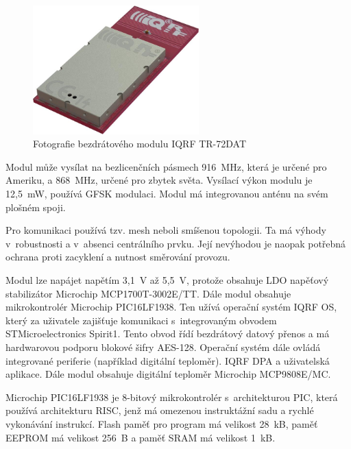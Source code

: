 \documentclass[12pt,a4paper]{article}
\begin{document}
\begin{figure}[H]
\centering
\label{fig:iqrf/fotka}
\includegraphics[width = 64mm]{img/iqrf/dctr-72dat.png}
\caption{Fotografie bezdrátového modulu IQRF TR-72DAT}
\end{figure}

Modul může vysílat na bezlicenčních pásmech 916~MHz, která je určené pro Ameriku, a 868~MHz, určené pro zbytek světa. Vysílací výkon modulu je 12,5~mW, používá GFSK modulaci. Modul má integrovanou anténu na svém plošném spoji.

Pro komunikaci používá tzv. mesh neboli smíšenou topologii. Ta má výhody v~robustnosti a v~absenci centrálního prvku. Její nevýhodou je naopak potřebná ochrana proti zacyklení a nutnost směrování provozu.

Modul lze napájet napětím 3,1~V až 5,5~V, protože obsahuje LDO napěťový stabilizátor Microchip MCP1700T-3002E/TT. Dále modul obsahuje mikrokontrolér Microchip PIC16LF1938. Ten užívá operační systém IQRF OS, který za uživatele zajišťuje komunikaci s~integrovaným obvodem STMicroelectronics Spirit1. Tento obvod řídí bezdrátový datový přenos a má hardwarovou podporu blokové šifry AES-128. Operační systém dále ovládá integrované periferie (například digitální teploměr). IQRF DPA a uživatelská aplikace. Dále modul obsahuje digitální teploměr Microchip MCP9808E/MC.

Microchip PIC16LF1938 je 8-bitový mikrokontrolér s~architekturou PIC, která používá architekturu RISC, jenž má omezenou instruktážní sadu a rychlé vykonávání instrukcí. Flash paměť pro program má velikost 28~kB, paměť EEPROM má velikost 256~B a paměť SRAM má velikost 1~kB.
\end{document}
